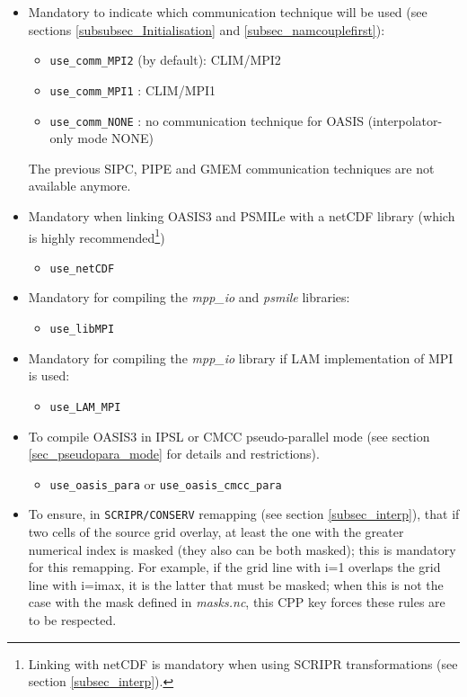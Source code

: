 \begin{itemize}

\item Mandatory to indicate which communication technique will be used
  (see sections \ref{subsubsec_Initialisation} and \ref{subsec_namcouplefirst}):
  \begin{itemize}
  \item {\tt use\_comm\_MPI2} (by default): CLIM/MPI2 
  \item {\tt use\_comm\_MPI1} : CLIM/MPI1
  \item {\tt use\_comm\_NONE} : no communication technique for OASIS
    (interpolator-only mode NONE)
  \end{itemize}
  The previous SIPC, PIPE and GMEM communication techniques are not 
  available anymore.

\item Mandatory when linking OASIS3 and PSMILe with a netCDF library (which is
  highly recommended\footnote{Linking with netCDF is mandatory when
    using SCRIPR transformations (see section \ref{subsec_interp}).})
  \begin{itemize}
  \item{\tt use\_netCDF}
  \end{itemize}

\item Mandatory for compiling the {\it mpp\_io} and {\it psmile}
  libraries:
  \begin{itemize}
  \item{\tt use\_libMPI}
  \end{itemize}

\item Mandatory for compiling the {\it mpp\_io} library if LAM
  implementation of MPI is used:
  \begin{itemize}
  \item{\tt use\_LAM\_MPI}
  \end{itemize}

\item To compile OASIS3 in IPSL or CMCC pseudo-parallel mode (see section
  \ref{sec_pseudopara_mode} for details and restrictions). 
  \begin{itemize}
  \item {\tt use\_oasis\_para} or {\tt use\_oasis\_cmcc\_para}
  \end{itemize}
  
\item To ensure, in {\tt SCRIPR/CONSERV} remapping (see section
  \ref{subsec_interp}), that if two cells of the source grid overlay,
  at least the one with the greater numerical index is masked (they
  also can be both masked); this is mandatory for this remapping. For
  example, if the grid line with i=1 overlaps the grid line with
  i=imax, it is the latter that must be masked; when this is not the
  case with the mask defined in {\it masks.nc}, this CPP key forces
  these rules are to be respected.


\end{itemize}

